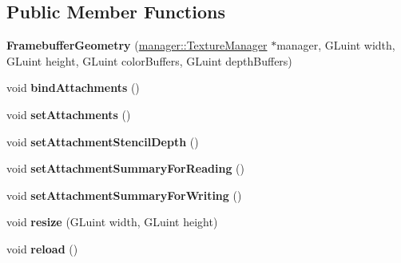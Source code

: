 \subsection*{Public Member Functions}
\begin{DoxyCompactItemize}
\item 
\hypertarget{classfillwave_1_1core_1_1FramebufferGeometry_a59763606fd9b16695580349c22edc9ae}{}{\bfseries Framebuffer\+Geometry} (\hyperlink{classfillwave_1_1manager_1_1TextureManager}{manager\+::\+Texture\+Manager} $\ast$manager, G\+Luint width, G\+Luint height, G\+Luint color\+Buffers, G\+Luint depth\+Buffers)\label{classfillwave_1_1core_1_1FramebufferGeometry_a59763606fd9b16695580349c22edc9ae}

\item 
\hypertarget{classfillwave_1_1core_1_1FramebufferGeometry_a749f0d5db2e911266fa5ec233b67f23f}{}void {\bfseries bind\+Attachments} ()\label{classfillwave_1_1core_1_1FramebufferGeometry_a749f0d5db2e911266fa5ec233b67f23f}

\item 
\hypertarget{classfillwave_1_1core_1_1FramebufferGeometry_a3d5766e2a836120d1f4c733b6421794a}{}void {\bfseries set\+Attachments} ()\label{classfillwave_1_1core_1_1FramebufferGeometry_a3d5766e2a836120d1f4c733b6421794a}

\item 
\hypertarget{classfillwave_1_1core_1_1FramebufferGeometry_af285b90c3782003d5d98b8e618216c3b}{}void {\bfseries set\+Attachment\+Stencil\+Depth} ()\label{classfillwave_1_1core_1_1FramebufferGeometry_af285b90c3782003d5d98b8e618216c3b}

\item 
\hypertarget{classfillwave_1_1core_1_1FramebufferGeometry_a71047970c333245214cae3f054c42799}{}void {\bfseries set\+Attachment\+Summary\+For\+Reading} ()\label{classfillwave_1_1core_1_1FramebufferGeometry_a71047970c333245214cae3f054c42799}

\item 
\hypertarget{classfillwave_1_1core_1_1FramebufferGeometry_a099fde18e37ff62215bea3ba6b736aa2}{}void {\bfseries set\+Attachment\+Summary\+For\+Writing} ()\label{classfillwave_1_1core_1_1FramebufferGeometry_a099fde18e37ff62215bea3ba6b736aa2}

\item 
\hypertarget{classfillwave_1_1core_1_1FramebufferGeometry_a5db11b693de9a4b8861f490fe861ef63}{}void {\bfseries resize} (G\+Luint width, G\+Luint height)\label{classfillwave_1_1core_1_1FramebufferGeometry_a5db11b693de9a4b8861f490fe861ef63}

\item 
\hypertarget{classfillwave_1_1core_1_1FramebufferGeometry_af6f8fa2c63b223d1e6db143fc523f09e}{}void {\bfseries reload} ()\label{classfillwave_1_1core_1_1FramebufferGeometry_af6f8fa2c63b223d1e6db143fc523f09e}

\end{DoxyCompactItemize}
